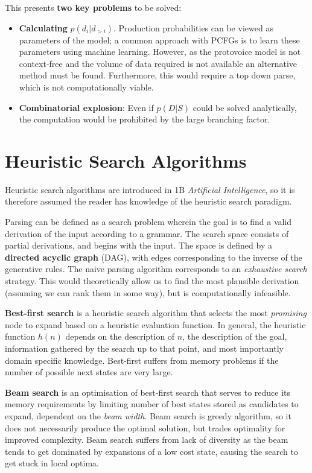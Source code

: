 \documentclass[12pt,a4paper,twoside,openright]{report}
\theoremstyle{definition}
\begin{document}
This presents \textbf{two key problems} to be solved:
\begin{itemize}
  \item \textbf{Calculating} $p(d_i|d_{>i})$. Production probabilities can be viewed as parameters of the model; a common approach with PCFGs is to learn these parameters using machine learning. However, as the protovoice model is not context-free and the volume of data required is not available an alternative method must be found. Furthermore, this would require a top down parse, which is not computationally viable.
  \item \textbf{Combinatorial explosion}: Even if $p(D|S)$ could be solved analytically, the computation would be prohibited by the large branching factor.
\end{itemize}

\section{Heuristic Search Algorithms}

Heuristic search algorithms are introduced in 1B \textit{Artificial Intelligence}, so it is therefore assumed the reader has knowledge of the heuristic search paradigm.

Parsing can be defined as a search problem wherein the goal is to find a valid derivation of the input according to a grammar. The search space consists of partial derivations, and begins with the input. The space is defined by a \textbf{directed acyclic graph} (DAG), with edges corresponding to the inverse of the generative rules. 
The naive parsing algorithm corresponds to an \textit{exhaustive search} strategy. This would theoretically allow us to find the most plausible derivation (assuming we can rank them in some way), but is computationally infeasible.

\textbf{Best-first search} is a heuristic search algorithm that selects the most \textit{promising} node to expand based on a heuristic evaluation function. 
In general, the heuristic function $h(n)$ depends on  the description of $n$, the description of the goal, information gathered by the search up to that point, and most importantly domain specific knowledge\cite{pearlHeuristicsIntelligentSearch1984}. Best-first suffers from memory problems if the number of possible next states are very large.

\textbf{Beam search} is an optimisation of best-first search that serves to reduce its memory requirements by limiting number of best states stored as candidates to expand, dependent on the \textit{beam width}. 
Beam search is greedy algorithm, so it does not necessarily produce the optimal solution, but trades optimality for improved complexity. Beam search suffers from lack of diversity as the beam tends to get dominated by expansions of a low cost state, causing the search to get stuck in local optima. \cite{}
\end{document}

